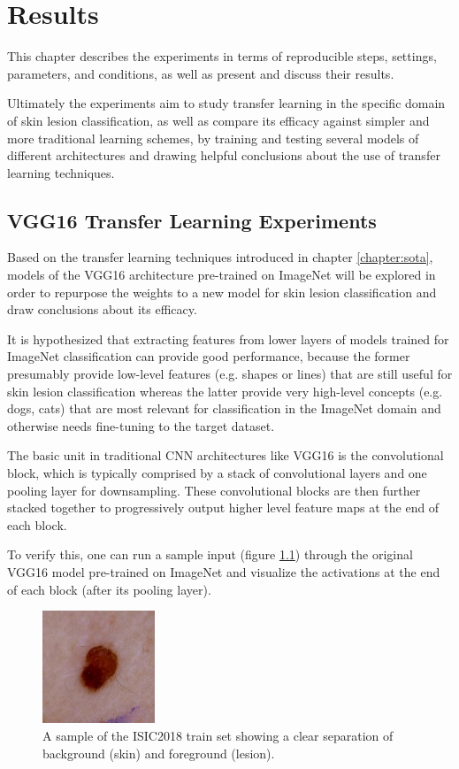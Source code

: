 \chapter{Results}
\label{chapter:results}

This chapter describes the experiments in terms of reproducible steps, settings, parameters, and conditions, as well as present and discuss their results.

Ultimately the experiments aim to study transfer learning in the specific domain of skin lesion classification, as well as compare its efficacy against simpler and more traditional learning schemes, by training and testing several models of different architectures and drawing helpful conclusions about the use of transfer learning techniques.

\section{VGG16 Transfer Learning Experiments}

Based on the transfer learning techniques introduced in chapter \ref{chapter:sota}, models of the VGG16 architecture pre-trained on ImageNet will be explored in order to repurpose the weights to a new model for skin lesion classification and draw conclusions about its efficacy.

It is hypothesized that extracting features from lower layers of models trained for ImageNet classification can provide good performance, because the former presumably provide low-level features (e.g. shapes or lines) that are still useful for skin lesion classification whereas the latter provide very high-level concepts (e.g. dogs, cats) that are most relevant for classification in the ImageNet domain and otherwise needs fine-tuning to the target dataset.

The basic unit in traditional \ac{CNN} architectures like VGG16 is the convolutional block, which is typically comprised by a stack of convolutional layers and one pooling layer for downsampling. These convolutional blocks are then further stacked together to progressively output higher level feature maps at the end of each block.

To verify this, one can run a sample input (figure \ref{fig:sample_input}) through the original VGG16 model pre-trained on ImageNet and visualize the activations at the end of each block (after its pooling layer).

\begin{figure}[ht]
    \centering
    \includegraphics[width=0.3\textwidth]{figs/sample_input.jpg}
    \caption{A sample of the ISIC2018 train set showing a clear separation of background (skin) and foreground (lesion).}
    \label{fig:sample_input}
\end{figure}

